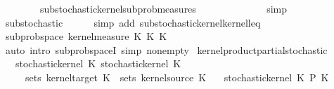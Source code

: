 \begin{isabellebody}
\ \ \ \ \ \ \ \ substochastic{\isacharunderscore}{\kern0pt}kernel{\isachardot}{\kern0pt}subprob{\isacharunderscore}{\kern0pt}measures{\isacharparenright}{\kern0pt}\isanewline
\ \ \isamarkupfalse%
\ \isamarkupfalse%
\ {\isachardoublequoteopen}{\isachardot}{\kern0pt}{\isachardot}{\kern0pt}{\isachardot}{\kern0pt}\ {\isasymle}\ {}{\isachardoublequoteclose}\isanewline
\ \ \ \ \isamarkupfalse%
\ simp\isanewline
\ \ \ \ \isamarkupfalse%
\ substochastic\isanewline
\ \ \ \ \isamarkupfalse%
\ {\isacharparenleft}{\kern0pt}simp\ add{\isacharcolon}{\kern0pt}\ substochastic{\isacharunderscore}{\kern0pt}kernel{\isachardot}{\kern0pt}kernel{\isacharunderscore}{\kern0pt}leq{\isacharunderscore}{\kern0pt}{}{\isacharparenright}{\kern0pt}\isanewline
\ \ \isamarkupfalse%
\ \isamarkupfalse%
\ {\isachardoublequoteopen}subprob{\isacharunderscore}{\kern0pt}space\ {\isacharparenleft}{\kern0pt}kernel{\isacharunderscore}{\kern0pt}measure\ {\isacharparenleft}{\kern0pt}K{\isacharunderscore}{\kern0pt}{}\ {\isasymOtimes}\isactrlsub K\ K{\isacharunderscore}{\kern0pt}{}{\isacharparenright}{\kern0pt}\ {\isasymomega}{\isacharparenright}{\kern0pt}{\isachardoublequoteclose}\isanewline
\ \ \ \ \isamarkupfalse%
\ {\isacharparenleft}{\kern0pt}auto\ intro{\isacharcolon}{\kern0pt}\ subprob{\isacharunderscore}{\kern0pt}spaceI\ simp{\isacharcolon}{\kern0pt}\ nonempty{\isacharparenright}{\kern0pt}\isanewline
{}\isamarkupfalse%
%
\endisatagproof
{\isafoldproof}%
%
\isadelimproof
\isanewline
%
\endisadelimproof
\isanewline
{}\isamarkupfalse%
\ kernel{\isacharunderscore}{\kern0pt}product{\isacharunderscore}{\kern0pt}partial{\isacharunderscore}{\kern0pt}stochastic{\isacharcolon}{\kern0pt}\isanewline
\ \ \ {\isachardoublequoteopen}stochastic{\isacharunderscore}{\kern0pt}kernel\ K\ {\isachardoublequoteopen}stochastic{\isacharunderscore}{\kern0pt}kernel\ K\isanewline
\ \ \ \ \ {\isachardoublequoteopen}sets\ {\isacharparenleft}{\kern0pt}kernel{\isacharunderscore}{\kern0pt}target\ K\ {\isacharequal}{\kern0pt}\ sets\ {\isacharparenleft}{\kern0pt}kernel{\isacharunderscore}{\kern0pt}source\ K\isanewline
\ \ \ {\isachardoublequoteopen}stochastic{\isacharunderscore}{\kern0pt}kernel\ {\isacharparenleft}{\kern0pt}K\ {\isasymOtimes}\isactrlsub P\ K\isanewline

\end{isabellebody}
